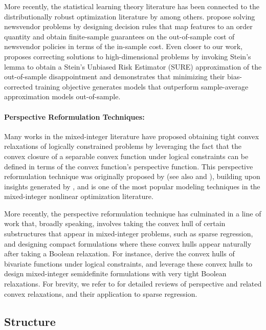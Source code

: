 \documentclass[opre,nonblindrev]{informs3} %
\begin{document}
More recently, the statistical learning theory literature has been connected to the distributionally robust optimization literature by \cite{ban2019big, gupta2021small} among others. \cite{ban2019big} propose solving newsvendor problems by designing decision rules that map features to an order quantity and obtain finite-sample guarantees on the out-of-sample cost of newsvendor policies in terms of the in-sample cost. Even closer to our work, \cite{gupta2021small} proposes correcting solutions to high-dimensional problems by invoking Stein's lemma to obtain a Stein's Unbiased Risk Estimator (SURE) approximation of the out-of-sample disappointment and demonstrates that minimizing their bias-corrected training objective generates models that outperform sample-average approximation models out-of-sample.

\paragraph{Perspective Reformulation Techniques:}
Many works in the mixed-integer literature have proposed obtaining tight convex relaxations of logically constrained problems by leveraging the fact that the convex closure of a separable convex function under logical constraints can be defined in terms of the convex function's perspective function. This perspective reformulation technique was originally proposed by \cite{  frangioni2006perspective} (see also \cite{akturk2009strong} and \cite{gunluk2010perspective}), building upon insights generated by \cite{ceria1999convex}, and is one of the most popular modeling techniques in the mixed-integer nonlinear optimization literature. 

More recently, the perspective reformulation technique has culminated in a line of work that, broadly speaking, involves taking the convex hull of certain substructures that appear in mixed-integer problems, such as sparse regression, and designing compact formulations where these convex hulls appear naturally after taking a Boolean relaxation. For instance, \cite{han20202x2} derive the convex hulls of bivariate functions under logical constraints, and leverage these convex hulls to design mixed-integer semidefinite formulations with very tight Boolean relaxations. For brevity, we refer to \cite{atamturk2019rank, atamturk2020safe,bertsimas2021unified} for detailed reviews of perspective and related convex relaxations, and their application to sparse regression.


\subsection{Structure}
\end{document}
